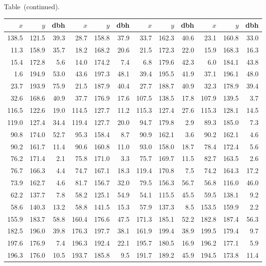 \documentclass[draft]{article}
\begin{document}
\scriptsize
\begin{center}
{\normalsize Table~\thetable (continued).}
\par\vspace{\baselineskip}\par
\begin{tabular}{rrrrrrrrrrrr}
\hline
\(x\)&\(y\)& dbh &\(x\)&\(y\)& dbh &\(x\)&\(y\)& dbh &\(x\)&\(y\)& dbh \\
\hline
138.5&121.5& 39.3& 28.7&158.8& 37.9& 33.7&162.3& 40.6& 23.1&160.8& 33.0\\
 11.3&158.9& 35.7& 18.2&168.2& 20.6& 21.5&172.3& 22.0& 15.9&168.3& 16.3\\
 15.4&172.8&  5.6& 14.0&174.2&  7.4&  6.8&179.6& 42.3&  6.0&184.1& 43.8\\
  1.6&194.9& 53.0& 43.6&197.3& 48.1& 39.4&195.5& 41.9& 37.1&196.1& 48.0\\
 23.7&193.9& 75.9& 21.5&187.9& 40.4& 27.7&188.7& 40.9& 32.3&178.9& 39.4\\
 32.6&168.6& 40.9& 37.7&176.9& 17.6&107.5&138.5& 17.8&107.9&139.5&  3.7\\
116.5&122.6& 19.0&114.5&127.7& 11.2&115.3&127.4& 27.6&115.3&128.1& 14.5\\
119.0&127.4& 34.4&119.4&127.7& 20.0& 94.7&179.8&  2.9& 89.3&185.0&  7.3\\
 90.8&174.0& 52.7& 95.3&158.4&  8.7& 90.9&162.1&  3.6& 90.2&162.1&  4.6\\
 90.2&161.7& 11.4& 90.6&160.8& 11.0& 93.0&158.0& 18.7& 78.4&172.4&  5.6\\
 76.2&171.4&  2.1& 75.8&171.0&  3.3& 75.7&169.7& 11.5& 82.7&163.5&  2.6\\
 76.7&166.3&  4.4& 74.7&167.1& 18.3&119.4&170.8&  7.5& 74.2&164.3& 17.2\\
 73.9&162.7&  4.6& 81.7&156.7& 32.0& 79.5&156.3& 56.7& 56.8&116.0& 46.0\\
 62.2&137.7&  7.8& 58.2&125.1& 54.9& 54.1&115.5& 45.5& 59.5&138.1&  9.2\\
 58.6&140.3& 13.2& 58.8&141.5& 15.3& 57.9&137.3&  8.5&153.5&159.9&  2.2\\
155.9&183.7& 58.8&160.4&176.6& 47.5&171.3&185.1& 52.2&182.8&187.4& 56.3\\
182.5&196.0& 39.8&176.3&197.7& 38.1&161.9&199.4& 38.9&199.5&179.4&  9.7\\
197.6&176.9&  7.4&196.3&192.4& 22.1&195.7&180.5& 16.9&196.2&177.1&  5.9\\
196.3&176.0& 10.5&193.7&185.8&  9.5&191.7&189.2& 45.9&194.5&173.8& 11.4\\

\end{tabular}
\end{center}
\end{document}
